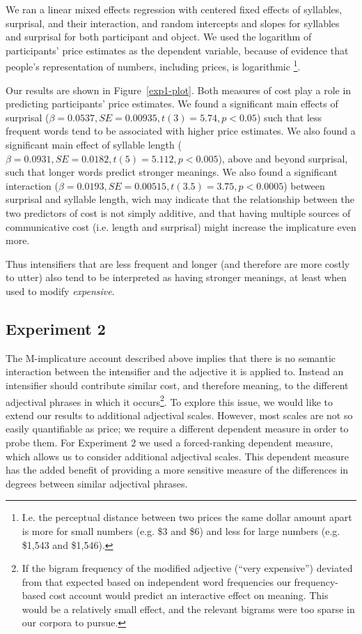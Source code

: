 \documentclass[a4paper,10pt]{article}
\begin{document}
      We ran a linear mixed effects regression with centered fixed effects of syllables, surprisal, and their interaction, and random intercepts and slopes for syllables and surprisal for both participant and object.
      We used the logarithm of participants' price estimates as the dependent variable, because of evidence that people's representation of numbers, including prices, is logarithmic \cite[e.g.]{dehaene}\footnote{I.e. the perceptual distance between two prices the same dollar amount apart is more for small numbers (e.g. \$3 and \$6) and less for large numbers (e.g. \$1,543 and \$1,546).}.
      
      Our results are shown in Figure~\ref{exp1-plot}. Both measures of cost play a role in predicting participants' price estimates. We found a significant main effects of surprisal ($\beta=0.0537, SE=0.00935, t(3)=5.74, p<0.05$) such that less frequent words tend to be associated with higher price estimates. We also found a significant main effect of syllable length ($\beta=0.0931, SE=0.0182, t(5)=5.112, p<0.005$), above and beyond surprisal, such that longer words predict stronger meanings. We also found a significant interaction ($\beta=0.0193, SE=0.00515, t(3.5)=3.75, p<0.0005$) between surprisal and syllable length, wich may indicate that the relationship between the two predictors of cost is not simply additive, and that having multiple sources of communicative cost (i.e. length and surprisal) might increase the implicature even more.

      Thus intensifiers that are less frequent and longer (and therefore are more costly to utter) also tend to be interpreted as having stronger meanings, at least when used to modify \emph{expensive}. %
  
  \subsection{Experiment 2}
      The M-implicature account described above implies that there is no semantic interaction between the intensifier and the adjective it is applied to. Instead an intensifier should contribute similar cost, and therefore meaning, to the different adjectival phrases in which it occurs\footnote{If the bigram frequency of the modified adjective (``very expensive'') deviated from that expected based on independent word frequencies our frequency-based cost account would predict an interactive effect on meaning. This would be a relatively small effect, and the relevant bigrams were too sparse in our corpora to pursue.}.
      To explore this issue, we would like to extend our results to additional adjectival scales. However, most scales are not so easily quantifiable as price; we require a different dependent measure in order to probe them.
      For Experiment 2 we used a forced-ranking dependent measure, which allows us to consider additional adjectival scales. This dependent measure has the added benefit of providing a more sensitive measure of the differences in degrees between similar adjectival phrases.
\end{document}
